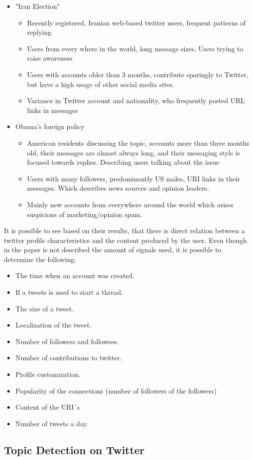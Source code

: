 \begin{itemize}
  \item "Iran Election"
  \begin{itemize}
    \item Recently registered, Iranian web-based twitter users, frequent patterns of replying
    \item Users from every where in the world, long message sizes. Users trying to raise awareness
    \item Users with accounts older than 3 months, contribute sparingly to Twitter, but have a high usage of other social media sites.
    \item Variance in Twitter account and nationality, who frequently posted URL links in messages
  \end{itemize}
\end{itemize}

\begin{itemize}
  \item Obama’s foreign policy
  \begin{itemize}
    \item American residents discussing the topic, accounts more than three months old, their messages are almost always long, and their messaging style is focused towards replies. Describing users talking about the issue
    \item Users with many followers, predominantly US males, URI links in their messages. Which describes news sources and opinion leaders.
    \item Mainly new accounts from everywhere around the world which arises suspicions of marketing/opinion spam.
  \end{itemize}
\end{itemize}

It is possible to see based on their results, that there is direct relation between a twitter profile characteristics and the content produced by the user. Even though in the paper is not described the amount of signals used, it is possible to determine the following:
\begin{itemize}
  \item The time when an account was created.
  \item If a tweets is used to start a thread.
  \item The size of a tweet.
  \item Localization of the tweet.
  \item Number of followers and followees.
  \item Number of contributions to twitter.
  \item Profile customization.
  \item Popularity of the connections (number of followers of the followers)
  \item Content of the URI´s
  \item Number of tweets a day.
\end{itemize}


\subsection{Topic Detection on Twitter} %
\label{sub:topic_detection_on_twitter}


